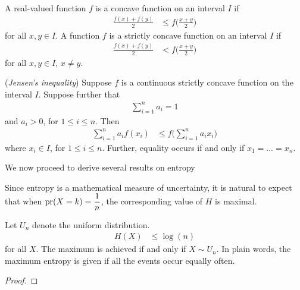 \documentclass[a4paper, 12pt]{book} %
\begin{document}
\begin{definition}
    A real-valued function $f$ is a concave function on an interval $I$ if
    \begin{align}
        \frac{f(x) + f(y)}{2} &\leq f \bigg( \frac{x+y}{2} \bigg)
    \end{align}
    for all $x, y \in I$. A function $f$ is a strictly concave function on an interval $I$ if
    \begin{align}
        \frac{f(x) + f(y)}{2} &< f \bigg( \frac{x+y}{2} \bigg)
    \end{align}
    for all $x, y \in I$, $x \neq y$.
\end{definition}

\begin{theorem}
    (\emph{Jensen's inequality}) Suppose $f$ is a continuous strictly concave function on the interval $I$. Suppose further that
    \begin{align}
        \sum_{i=1}^n a_i = 1
    \end{align}
    and $a_i > 0$, for $1 \leq i \leq n$. Then 
    \begin{align}
        \sum_{i=1}^n a_i f(x_i) &\leq f\bigg( \sum_{i=1}^n a_i x_i\bigg)
    \end{align}
    where $x_i \in I$, for $1 \leq i \leq n$. Further, equality occurs if and only if $x_1 = \ldots = x_n$.
\end{theorem}
We now proceed to derive several results on entropy

Since entropy is a mathematical measure of uncertainty, it is natural to
expect that when $\operatorname{pr}(X =k) = \dfrac{1}{n}$, the corresponding value of $H$ is maximal.
\begin{proposition}
    Let $U_n$ denote the uniform distribution. 
    \begin{align}
        H(X) &\leq \log(n) 
    \end{align}
    for all $X$. The maximum is achieved if and only if $X \sim U_n$. In plain words, the maximum entropy is given if all the events occur equally often.
\end{proposition}
\begin{proof}
    
\end{proof}
\end{document}
